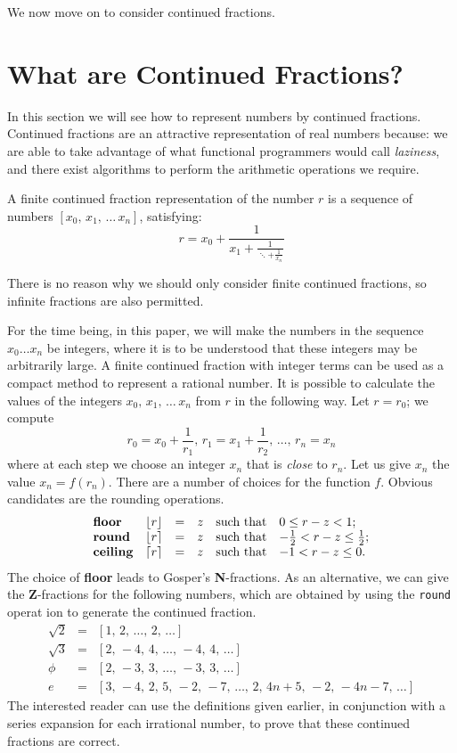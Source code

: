 We now move on to consider continued fractions.

\section{What are Continued Fractions?}
 
In this section we will see how to represent numbers by continued fractions.
Continued fractions are an attractive representation of real numbers
because: we are able to take advantage of what functional programmers
would call {\em laziness}, and there exist algorithms to perform the
arithmetic operations we require.

\begin{definition}\rm A finite continued fraction representation of
the number $r$ is a sequence of numbers $[x_0,\,x_1,\,\ldots \, x_n]$,
satisfying:
\[r=x_0+\frac{1}{x_1 +\frac{1}{\ddots + \frac{1}{x_n}}}\]
\end{definition}

There is no reason why we should only consider finite continued
fractions, so infinite fractions are also permitted.

For the time being, in this paper, we will make the numbers in the
sequence $x_0\ldots x_n$ be integers, where it is to be understood
that these integers may be arbitrarily large. A finite continued
fraction with integer terms can be used as a compact method to represent
a rational number.  It is possible to calculate the values of the
integers $x_0,\,x_1,\,\ldots \, x_n$ from $r$ in the following way.
Let $r = r_0$; we compute
\[r_0 = x_0 + \frac{1}{r_1},\,
  r_1 = x_1 + \frac{1}{r_2},\,\ldots,\,r_n = x_n \]
where at each step we choose an integer $x_n$ that is {\em close} to
$r_n$. Let us give $x_n$ the value $x_n = f(r_n)$. There are a number
of choices for the function $f$. Obvious candidates are the rounding
operations.
\[\begin{array}{llllll}
\mbox{{\bf floor}} &\lfloor r\rfloor & = & z&\mbox{such that} &
0 \leq r-z < 1;\\
\mbox{{\bf round}} &\lfloor r\rceil & = &z&\mbox{such that} &
-\frac{1}{2} < r-z \leq \frac{1}{2};\\
\mbox{{\bf ceiling}} &\lceil r\rceil & = &z&  \mbox{such that} &
-1 < r-z \leq 0.
\end{array}\]
The choice of \mbox{{\bf floor}} leads to Gosper's {\bf N}-fractions.
As an alternative, we can give the {\bf Z}-fractions for the following
numbers, which are obtained by using the \mbox{\tt round} operat
ion to generate
the continued fraction.
\[\begin{array}{lll}
\sqrt{2} & = & [1,\,2,\,\ldots,\,2,\,\ldots]\\
\sqrt{3} & = & [2,\,-4,\,4,\,\ldots,\,-4,\,4,\,\ldots]\\
\phi     & = & [2,\,-3,\,3,\,\ldots,\,-3,\,3,\,\ldots]\\
e & = & [3,\,-4,\,2,\,5,\,-2,\,-7,\,\ldots,\,2,\,4n+5,\,-2,\,-4n-7,\,\ldots]
\end{array}\]
The interested reader can use the definitions given earlier, in
conjunction with a series expansion for each irrational number, to
prove that these continued fractions are correct.

